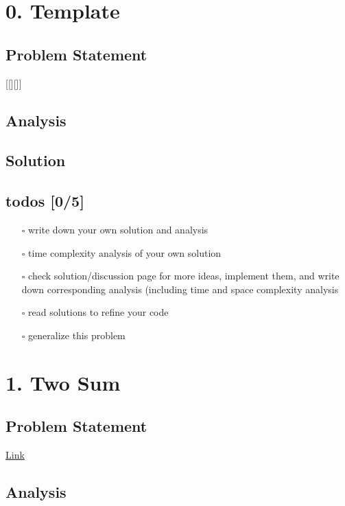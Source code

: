 \documentclass[11pt]{article}
\date{\today}
\title{}
\begin{document}
\tableofcontents


\section{0. Template \label{org3619352}}
\label{sec:org8d618db}
\subsection{Problem Statement}
\label{sec:org6ee2756}
[[][]]
\subsection{Analysis}
\label{sec:orga7a3fbb}

\subsection{Solution}
\label{sec:orga70f9d0}

\subsection{todos [0/5]}
\label{sec:org68127b5}
\begin{itemize}
\item[{$\square$}] write down your own solution and analysis
\item[{$\square$}] time complexity analysis of your own solution
\item[{$\square$}] check solution/discussion page for more ideas, implement them, and write down corresponding analysis (including time and space complexity analysis
\item[{$\square$}] read solutions to refine your code
\item[{$\square$}] generalize this problem
\end{itemize}
\section{1. Two Sum \label{org6d55649}}
\label{sec:orgca9c5ff}
\subsection{Problem Statement}
\label{sec:orgbc17c25}
\href{https://leetcode.com/problems/two-sum/}{Link}
\subsection{Analysis}
\label{sec:orgbd38446}
\end{document}
